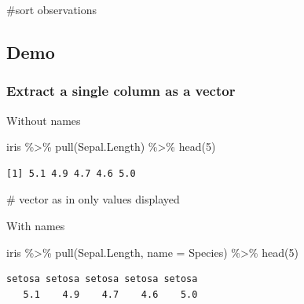 \documentclass[
  letterpaper,
  DIV=11,
  numbers=noendperiod]{scrartcl}
\newenvironment{Shaded}{\begin{snugshade}}{\end{snugshade}}
\newcommand{\AttributeTok}[1]{\textcolor[rgb]{0.40,0.45,0.13}{#1}}
\newcommand{\CommentTok}[1]{\textcolor[rgb]{0.37,0.37,0.37}{#1}}
\newcommand{\DecValTok}[1]{\textcolor[rgb]{0.68,0.00,0.00}{#1}}
\newcommand{\FunctionTok}[1]{\textcolor[rgb]{0.28,0.35,0.67}{#1}}
\newcommand{\NormalTok}[1]{\textcolor[rgb]{0.00,0.23,0.31}{#1}}
\newcommand{\SpecialCharTok}[1]{\textcolor[rgb]{0.37,0.37,0.37}{#1}}
\begin{document}
\begin{Shaded}
\begin{Highlighting}[]
\CommentTok{\#sort observations}
\end{Highlighting}
\end{Shaded}

\subsection{Demo}\label{demo-9}

\subsubsection{Extract a single column as a
vector}\label{extract-a-single-column-as-a-vector}

Without names

\begin{Shaded}
\begin{Highlighting}[]
\NormalTok{iris }\SpecialCharTok{\%\textgreater{}\%}
    \FunctionTok{pull}\NormalTok{(Sepal.Length) }\SpecialCharTok{\%\textgreater{}\%}
    \FunctionTok{head}\NormalTok{(}\DecValTok{5}\NormalTok{)}
\end{Highlighting}
\end{Shaded}

\begin{verbatim}
[1] 5.1 4.9 4.7 4.6 5.0
\end{verbatim}

\begin{Shaded}
\begin{Highlighting}[]
\CommentTok{\# vector as in only values displayed}
\end{Highlighting}
\end{Shaded}

With names

\begin{Shaded}
\begin{Highlighting}[]
\NormalTok{iris }\SpecialCharTok{\%\textgreater{}\%}
    \FunctionTok{pull}\NormalTok{(Sepal.Length, }\AttributeTok{name =}\NormalTok{ Species) }\SpecialCharTok{\%\textgreater{}\%}
    \FunctionTok{head}\NormalTok{(}\DecValTok{5}\NormalTok{)}
\end{Highlighting}
\end{Shaded}

\begin{verbatim}
setosa setosa setosa setosa setosa 
   5.1    4.9    4.7    4.6    5.0 
\end{verbatim}
\end{document}
